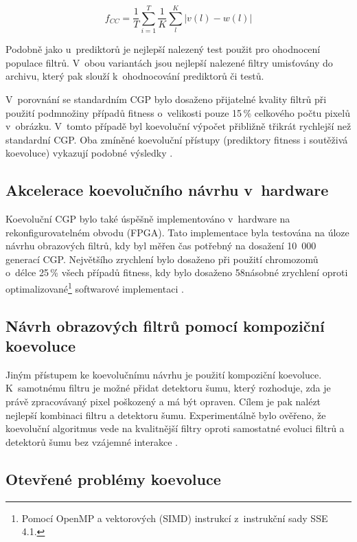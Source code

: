 \begin{equation}
    \label{eqFtestsIF}
    f_{\mathit{CC}} = \frac{1}{T} \sum\limits_{i=1}^{T} \frac{1}{K} \sum\limits_l^K \left| v\left( l \right) - w\left( l \right) \right|
\end{equation}

Podobně jako u~prediktorů je nejlepší nalezený test použit pro ohodnocení populace filtrů. V~obou variantách jsou nejlepší nalezené filtry umisťovány do archivu, který pak slouží k~ohodnocování prediktorů či testů.

V~porovnání se standardním CGP bylo dosaženo přijatelné kvality filtrů při použití podmnožiny případů fitness o~velikosti pouze 15\,\% celkového počtu pixelů v~obrázku. V~tomto případě byl koevoluční výpočet přibližně třikrát rychlejší než standardní CGP. Oba zmíněné koevoluční přístupy (prediktory fitness i soutěživá koevoluce) vykazují podobné výsledky \cite{SikuPPSN}.

\subsection{Akcelerace koevolučního návrhu v~hardware}

Koevoluční CGP bylo také úspěšně implementováno v~hardware na rekonfigurovatelném obvodu (FPGA). Tato implementace byla testována na úloze návrhu obrazových filtrů, kdy byl měřen čas potřebný na dosažení 10~000 generací CGP. Největšího zrychlení bylo dosaženo při použití chromozomů o~délce 25\,\% všech případů fitness, kdy bylo dosaženo 58násobné zrychlení oproti optimalizované\footnote{Pomocí OpenMP a vektorových (SIMD) instrukcí z~instrukční sady SSE 4.1.} softwarové implementaci \cite{Hrbacek}.

\subsection{Návrh obrazových filtrů pomocí kompoziční koevoluce}

Jiným přístupem ke koevolučnímu návrhu je použití kompoziční koevoluce. K~samotnému filtru je možné přidat detektoru šumu, který rozhoduje, zda je právě zpracovávaný pixel poškozený a má být opraven. Cílem je pak nalézt nejlepší kombinaci filtru a detektoru šumu. Experimentálně bylo ověřeno, že koevoluční algoritmus vede na kvalitnější filtry oproti samostatné evoluci filtrů a detektorů šumu bez vzájemné interakce \cite{SikuKomjathy}.

\subsection{Otevřené problémy koevoluce}
\label{secProblems}

